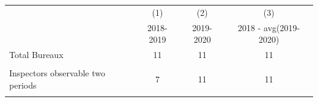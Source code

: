 {
\def\sym#1{\ifmmode^{#1}\else\(^{#1}\)\fi}
\begin{tabular}{l*{3}{c}}
\toprule
            &\multicolumn{1}{c}{(1)}&\multicolumn{1}{c}{(2)}&\multicolumn{1}{c}{(3)}\\
            &\multicolumn{1}{c}{2018-2019}&\multicolumn{1}{c}{2019-2020}&\multicolumn{1}{c}{2018 - avg(2019-2020)}\\
\midrule
Total Bureaux&          11         &          11         &          11         \\
            &                     &                     &                     \\
Inspectors observable two periods&           7         &          11         &          11         \\
            &                     &                     &                     \\
\bottomrule
\end{tabular}
}
